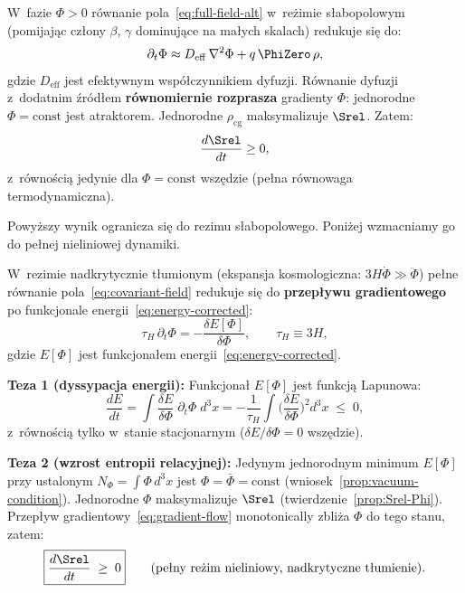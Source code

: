 \begin{proposition}\label{prop:second-law-formal}
W~fazie $\Phi > 0$ r\'ownanie pola~\eqref{eq:full-field-alt}
w~re\.zimie s\l{}abopolowym (pomijaj\k{a}c cz\l{}ony $\beta$,
$\gamma$ dominuj\k{a}ce na ma\l{}ych skalach) redukuje si\k{e} do:
\begin{equation}\label{eq:Phi-diffusion}
    \partial_t \Phi \approx D_{\mathrm{eff}}\,\nabla^2\Phi
    + q\,\PhiZero\,\rho,
\end{equation}
gdzie $D_{\mathrm{eff}}$ jest efektywnym wsp\'o\l{}czynnikiem
dyfuzji. R\'ownanie dyfuzji z~dodatnim \'zr\'od\l{}em
\textbf{r\'ownomiernie rozprasza} gradienty $\Phi$:
jednorodne $\Phi = \mathrm{const}$ jest atraktorem.
Jednorodne $\rho_{\mathrm{cg}}$ maksymalizuje $\Srel$.
Zatem:
\begin{equation}
    \frac{d\Srel}{dt} \geq 0,
\end{equation}
z~r\'owno\'sci\k{a} jedynie dla $\Phi = \mathrm{const}$ wsz\k{e}dzie
(pe\l{}na r\'ownowaga termodynamiczna).
\end{proposition}

Powy\.zszy wynik ogranicza si\k{e} do rezimu s\l{}abopolowego.
Poni\.zej wzmacniamy go do pe\l{}nej nieliniowej dynamiki.

\begin{proposition}\label{prop:second-law-nonlinear}
W~rezimie nadkrytycznie t\l{}umionym (ekspansja kosmologiczna:
$3H\dot\Phi \gg \ddot\Phi$) pe\l{}ne r\'ownanie
pola~\eqref{eq:covariant-field} redukuje si\k{e} do
\textbf{przep\l{}ywu gradientowego} po funkcjonale
energii~\eqref{eq:energy-corrected}:
\begin{equation}\label{eq:gradient-flow}
    \tau_H\,\partial_t\Phi
    = -\frac{\delta E[\Phi]}{\delta\Phi},
    \qquad \tau_H \equiv 3H,
\end{equation}
gdzie $E[\Phi]$ jest funkcjona\l{}em
energii~\eqref{eq:energy-corrected}.

\medskip\noindent
\textbf{Teza 1 (dyssypacja energii):}
Funkcjona\l{} $E[\Phi]$ jest funkcj\k{a} Lapunowa:
\begin{equation}\label{eq:energy-dissipation}
    \frac{dE}{dt}
    = \int \frac{\delta E}{\delta\Phi}\;\partial_t\Phi\;d^3x
    = -\frac{1}{\tau_H}
      \int \!\biggl(\frac{\delta E}{\delta\Phi}\biggr)^{\!2} d^3x
    \;\leq\; 0,
\end{equation}
z~r\'owno\'sci\k{a} tylko w~stanie stacjonarnym
($\delta E/\delta\Phi = 0$ wsz\k{e}dzie).

\medskip\noindent
\textbf{Teza 2 (wzrost entropii relacyjnej):}
Jedynym jednorodnym minimum $E[\Phi]$ przy ustalonym
$N_\Phi = \int\Phi\,d^3x$ jest $\Phi = \bar\Phi = \mathrm{const}$
(wniosek~\ref{prop:vacuum-condition}). Jednorodne $\Phi$
maksymalizuje $\Srel$ (twierdzenie~\ref{prop:Srel-Phi}).
Przep\l{}yw gradientowy~\eqref{eq:gradient-flow} monotonically
zbli\.za $\Phi$ do tego stanu, zatem:
\begin{equation}\label{eq:dSrel-full}
    \boxed{\frac{d\Srel}{dt} \;\geq\; 0}
    \qquad
    \text{(pe\l{}ny re\.zim nieliniowy, nadkrytyczne t\l{}umienie)}.
\end{equation}
\end{proposition}

